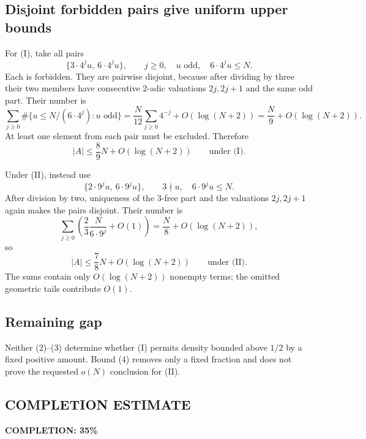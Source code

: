 \subsection*{Disjoint forbidden pairs give uniform upper bounds}
For (I), take all pairs
\[
 \{3\cdot4^j u,\ 6\cdot4^j u\},
 \qquad j\ge0,\quad u\text{ odd},\quad6\cdot4^j u\le N.
\]
Each is forbidden. They are pairwise disjoint, because after dividing by three their two members have consecutive $2$-adic valuations $2j,2j+1$ and the same odd part. Their number is
\[
 \sum_{j\ge0}\#\{u\le N/(6\cdot4^j):u\text{ odd}\}
 =\frac N{12}\sum_{j\ge0}4^{-j}+O(\log(N+2))
 =\frac N9+O(\log(N+2)).
\]
At least one element from each pair must be excluded. Therefore
\[
 |A|\le\frac89N+O(\log(N+2))\qquad\text{under (I)}. \tag{3}
\]

Under (II), instead use
\[
 \{2\cdot9^j u,\ 6\cdot9^j u\},
 \qquad 3\nmid u,\quad6\cdot9^j u\le N.
\]
After division by two, uniqueness of the $3$-free part and the valuations $2j,2j+1$ again makes the pairs disjoint. Their number is
\[
 \sum_{j\ge0}\left(\frac23\frac{N}{6\cdot9^j}+O(1)\right)
 =\frac N8+O(\log(N+2)),
\]
so
\[
 |A|\le\frac78N+O(\log(N+2))\qquad\text{under (II)}. \tag{4}
\]
The sums contain only $O(\log(N+2))$ nonempty terms; the omitted geometric tails contribute $O(1)$.

\subsection*{Remaining gap}
Neither (2)--(3) determine whether (I) permits density bounded above $1/2$ by a fixed positive amount. Bound (4) removes only a fixed fraction and does not prove the requested $o(N)$ conclusion for (II).
\subsection*{COMPLETION ESTIMATE}
\textbf{COMPLETION: 35\%}
